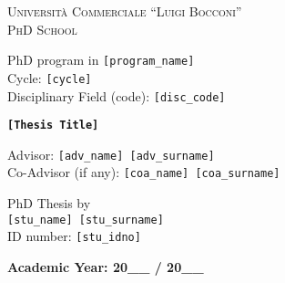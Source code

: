 \begin{titlepage}
  \Large  %
  \begin{center}
    {\LARGE \textsc{Università Commerciale ``Luigi Bocconi''} } \\
    {\LARGE \textsc{PhD School} }

    \vspace{1.5cm}

    \begin{raggedright}
      PhD program in \texttt{[program\_name]} \\
      Cycle: \texttt{[cycle]} \\
      Disciplinary Field (code): \texttt{[disc\_code]} \\
    \end{raggedright}

    \vfill

    {\Huge \bfseries \texttt{[Thesis Title]}}

    \vfill

    \begin{raggedright}
      Advisor: \texttt{[adv\_name] [adv\_surname]} \\
      Co-Advisor (if any): \texttt{[coa\_name] [coa\_surname]} \\
    \end{raggedright}

    \vspace{1.5cm}

    \begin{raggedleft}
      PhD Thesis by \\
      \texttt{[stu\_name] [stu\_surname]} \\
      ID number: \texttt{[stu\_idno]} \\
    \end{raggedleft}

    \vfill

    \textbf{Academic Year: 20\_\_ / 20\_\_}
  \end{center}
\end{titlepage}

